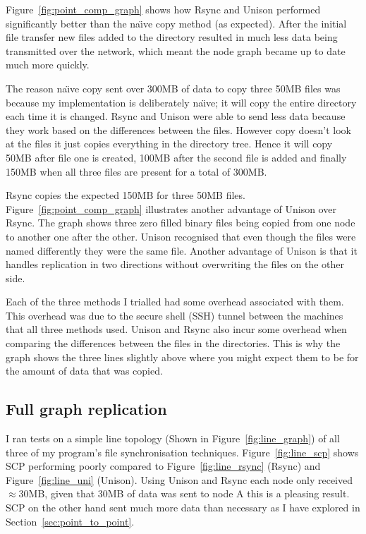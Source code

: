 \documentclass[12pt]{article}
\begin{document}
Figure~\ref{fig:point_comp_graph} shows how 
Rsync and Unison performed significantly better
than the na\"{\i}ve copy method (as expected). After the initial file
transfer new files added to the directory resulted in much less data
being transmitted over the network, which meant the node graph
became up to date much more quickly.

The reason na\"{\i}ve copy sent over 300MB of data to copy three 50MB
files was because my implementation is deliberately na\"{\i}ve; it will
copy the entire directory each time it is changed. Rsync and
Unison were able to send less data because they work based on the
differences between the files. However copy doesn't look at
the files it just copies everything in the directory tree.
Hence it will copy 50MB after file one is created, 100MB after
the second file is added and finally 150MB when all three
files are present for a total of 300MB.

Rsync copies the expected 150MB for three 50MB files.
Figure~\ref{fig:point_comp_graph} illustrates another advantage
of Unison over Rsync. The graph shows three zero filled
binary files being copied from one node to another one after
the other. Unison recognised that even though the files were named
differently they were the same file. Another advantage of Unison
is that it handles replication in two directions without
overwriting the files on the other side.

Each of the three methods I trialled had some overhead associated
with them. This overhead was due to the secure shell (SSH) tunnel between
the machines that all three methods used. Unison and Rsync also
incur some overhead when comparing the differences between the files
in the directories. This is why the graph shows the three lines
slightly above where you might expect them to be for the amount
of data that was copied.

\subsection{Full graph replication}
\label{sec:full_graph_rep}
I ran tests on a simple line topology (Shown in
Figure~\ref{fig:line_graph}) of all three of my
program's file synchronisation techniques.
Figure~\ref{fig:line_scp} shows SCP performing
poorly compared to Figure~\ref{fig:line_rsync} (Rsync)
and Figure~\ref{fig:line_uni} (Unison). Using Unison and
Rsync each node only received $\approx$30MB, given that
30MB of data was sent to node A this is a pleasing
result. SCP on the other hand sent much more data
than necessary as I have explored in 
Section~\ref{sec:point_to_point}. 
\end{document}
